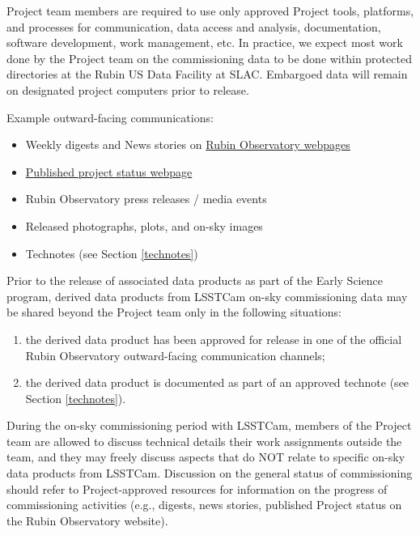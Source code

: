 \documentclass[SE,authoryear,toc,lsstdraft]{lsstdoc}
\begin{document}
Project team members are required to use only approved Project tools, platforms, and processes for communication, data access and analysis, documentation, software development, work management, etc.
In practice, we expect most work done by the Project team on the commissioning data to be done within protected directories at the Rubin US Data Facility at SLAC.
Embargoed data will remain on designated project computers prior to release.

Example outward-facing communications:

\begin{itemize}

  \item Weekly digests and News stories on \href{https://rubinobservatory.org/}{Rubin Observatory webpages}

  \item \href{https://www.lsst.org/about/project-status}{Published project status webpage}

  \item Rubin Observatory press releases / media events

  \item Released photographs, plots, and on-sky images

  \item Technotes (see Section \ref{technotes})

\end{itemize}

Prior to the release of associated data products as part of the Early Science program, derived data products from LSSTCam on-sky commissioning data may be shared beyond the Project team only in the following situations:

\begin{enumerate}

  \item the derived data product has been approved for release in one of the official Rubin Observatory outward-facing communication channels;

  \item the derived data product is documented as part of an approved technote (see Section \ref{technotes}).

\end{enumerate}


During the on-sky commissioning period with LSSTCam, members of the Project team are allowed to discuss technical details their work assignments outside the team, and they may freely discuss aspects that do NOT relate to specific on-sky data products from LSSTCam.
Discussion on the general status of commissioning should refer to Project-approved resources for information on the progress of commissioning activities (e.g., digests, news stories, published Project status on the Rubin Observatory website).
\end{document}
